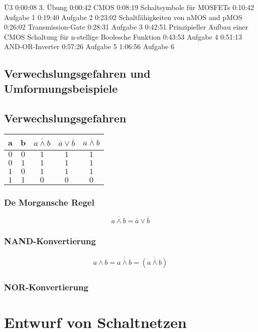 \documentclass[a4paper]{scrartcl}
\begin{document}
		Ü3
		0:00:08 3. Übung 0:00:42 CMOS 0:08:19 Schaltsymbole für MOSFETs 0:10:42 Aufgabe 1 0:19:40 Aufgabe 2 0:23:02 Schaltfähigkeiten von nMOS and pMOS 0:26:02 Transmission-Gate 0:28:31 Aufgabe 3 0:42:51 Prinzipieller Aufbau einer CMOS Schaltung für n-stellige Boolesche Funktion 0:43:53 Aufgabe 4 0:51:13 AND-OR-Inverter 0:57:26 Aufgabe 5 1:06:56 Aufgabe 6 
		
		\subsection{Verwechslungsgefahren und Umformungsbeispiele}
			\subsection{Verwechslungsgefahren}
			\begin{table}
				\centering
				\begin{tabular}{|c|c|c|c|c|}
					\hline
					a & b & \(\overline{a \wedge b} \) & \( \overline{a} \vee \overline{b} \)  & \( a \overline{\wedge} b \) \\
					\hline
					\( 0 \) & \( 0 \) & \( 1 \) & \( 1 \) & \( 1 \) \\
					\( 0 \) & \( 1 \) & \( 1 \) & \( 1 \) & \( 1 \) \\
					\( 1 \) & \( 0 \) & \( 1 \) & \( 1 \) & \( 1 \) \\
					\( 1 \) & \( 1 \) & \( 0 \) & \( 0 \) & \( 0 \) \\
					\hline
				\end{tabular}
			\end{table}
			\subsubsection{De Morgansche Regel}
			\[
			\overline{a \wedge b}
			= \overline{a} \vee \overline{b}
			\]
			\subsubsection{NAND-Konvertierung}
			\begin{align*}
				a \wedge b 
				= \overline{\overline{a \wedge b }}
				= \overline{(a \overline{\wedge} b )}
			\end{align*}
			\subsubsection{NOR-Konvertierung}
		
		\section{Entwurf von Schaltnetzen}
\end{document}
